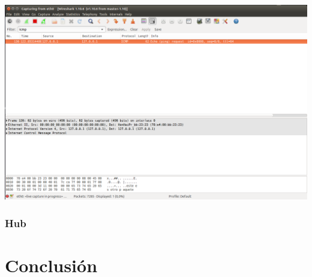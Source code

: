 ﻿\documentclass[spanish]{udpreport}
\begin{document}
\begin{center}
	\includegraphics[scale=.37]{imagenes/Switch/Test_3_Wireshark.png}
\end{center}

\newpage


\subsection{Hub}






\chapter{Conclusión}

\end{document}
